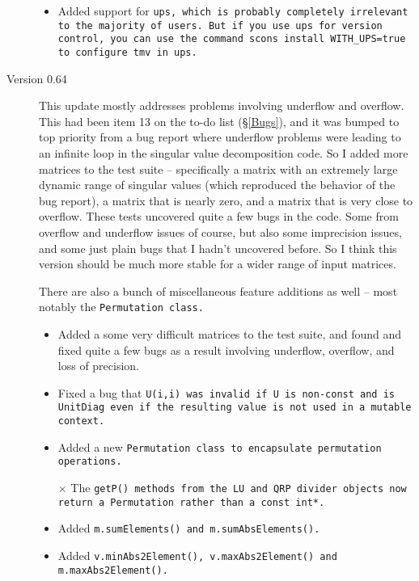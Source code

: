 \begin{description}
\begin{itemize}
\item
Added support for \tt{ups}, which is probably completely irrelevant
to the majority of users.  But if you use \tt{ups} for version control, you can
use the command \tt{scons install WITH\_UPS=true} to configure tmv in \tt{ups}.

\end{itemize}

\item[Version 0.64]
This update mostly addresses problems involving underflow and overflow.  This had 
been item 13 on the to-do list (\S\ref{Bugs}), and it was bumped to top priority from
a bug report where underflow problems were leading to an infinite loop in the 
singular value decomposition code.  So I added more matrices to the test suite -- 
specifically a matrix with an extremely large dynamic range of singular values
(which reproduced the behavior of the bug report), a matrix that is nearly zero,
and a matrix that is very close to overflow.  These tests uncovered quite a few bugs 
in the code.  Some from overflow and underflow issues of course, but also some
imprecision issues, and some just plain bugs that I hadn't uncovered before.  So 
I think this version should be much more stable for a wider range of input matrices.

There are also a bunch of miscellaneous feature additions as well -- most notably the \tt{Permutation} class.

\begin{itemize}

\item
Added a some very difficult matrices to the test suite, and found and fixed quite a few 
bugs as a result involving underflow, overflow, and loss of precision.  

\item 
Fixed a bug that \tt{U(i,i)} was invalid if \tt{U} is non-const and is \tt{UnitDiag} even 
if the resulting value is not used in a mutable context.  

\item 
Added a new \tt{Permutation} class to encapsulate permutation operations.  

\item[$\times$] 
The \tt{getP()} methods from the LU and QRP divider objects now return
a \tt{Permutation} rather than a \tt{const int*}.  

\item 
Added \tt{m.sumElements()} and \tt{m.sumAbsElements()}.

\item 
Added \tt{v.minAbs2Element()}, \tt{v.maxAbs2Element()} and \tt{m.maxAbs2Element()}.


\end{itemize}
\end{description}
